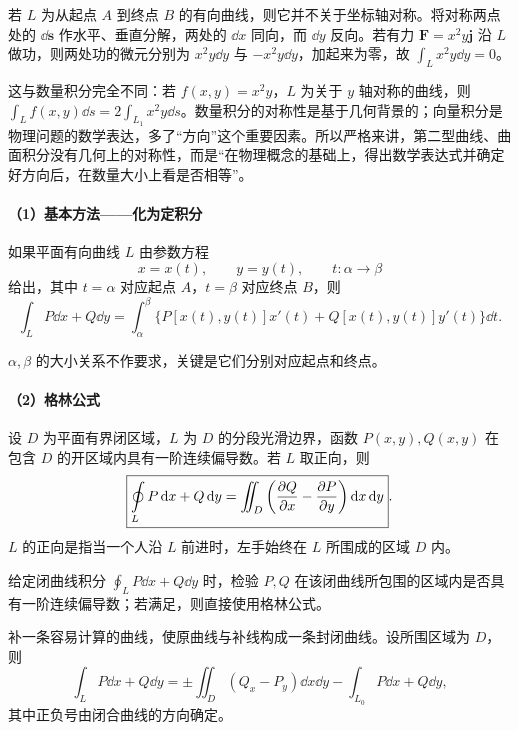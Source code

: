 \begin{notebox}
若 $L$ 为从起点 $A$ 到终点 $B$ 的有向曲线，则它并不关于坐标轴对称。将对称两点处的 $\dd\bm s$ 作水平、垂直分解，两处的 $\dd x$ 同向，而 $\dd y$ 反向。若有力 $\bm F=x^2y\bm j$ 沿 $L$ 做功，则两处功的微元分别为 $x^2y\dd y$ 与 $-x^2y\dd y$，加起来为零，故 $\int_Lx^2y\dd y=0$。

这与数量积分完全不同：若 $f(x,y)=x^2y$，$L$ 为关于 $y$ 轴对称的曲线，则 $\int_Lf(x,y)\dd s=2\int_{L_1}x^2y\dd s$。数量积分的对称性是基于几何背景的；向量积分是物理问题的数学表达，多了“方向”这个重要因素。所以严格来讲，第二型曲线、曲面积分没有几何上的对称性，而是“在物理概念的基础上，得出数学表达式并确定好方向后，在数量大小上看是否相等”。
\end{notebox}

\paragraph{（1）基本方法——化为定积分}

如果平面有向曲线 $L$ 由参数方程
\[
x=x(t),\qquad y=y(t),\qquad t:\alpha\to\beta
\]
给出，其中 $t=\alpha$ 对应起点 $A$，$t=\beta$ 对应终点 $B$，则
\[
\int_LP\dd x+Q\dd y
=\int_{\alpha}^{\beta}
\bigl\{P[x(t),y(t)]x'(t)+Q[x(t),y(t)]y'(t)\bigr\}\dd t.
\]

\begin{notebox}
$\alpha,\beta$ 的大小关系不作要求，关键是它们分别对应起点和终点。
\end{notebox}

\paragraph{（2）格林公式}

设 $D$ 为平面有界闭区域，$L$ 为 $D$ 的分段光滑边界，函数 $P(x,y),Q(x,y)$ 在包含 $D$ 的开区域内具有一阶连续偏导数。若 $L$ 取正向，则
\[
\boxed{
\oint\limits_L P\mathop{}\!\mathrm d x+Q\mathop{}\!\mathrm d y
=\iint_D\left(\frac{\partial Q}{\partial x}-\frac{\partial P}{\partial y}\right)\mathop{}\!\mathrm d x\mathop{}\!\mathrm d y
}.
\]
$L$ 的正向是指当一个人沿 $L$ 前进时，左手始终在 $L$ 所围成的区域 $D$ 内。

给定闭曲线积分 $\oint_LP\dd x+Q\dd y$ 时，检验 $P,Q$ 在该闭曲线所包围的区域内是否具有一阶连续偏导数；若满足，则直接使用格林公式。

补一条容易计算的曲线，使原曲线与补线构成一条封闭曲线。设所围区域为 $D$，则
\[
\int_LP\dd x+Q\dd y
=\pm\iint_D(Q_x-P_y)\dd x\dd y
-\int_{L_0}P\dd x+Q\dd y,
\]
其中正负号由闭合曲线的方向确定。

